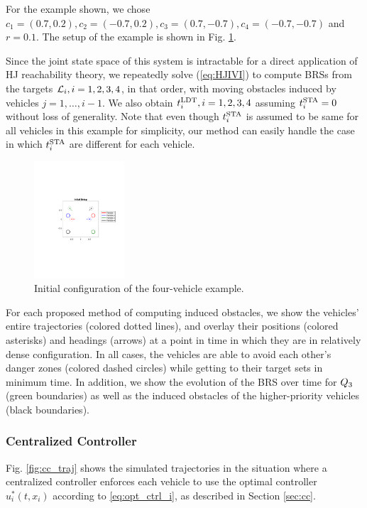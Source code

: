 \noindent For the example shown, we chose $c_1 = (0.7, 0.2), c_2 = (-0.7, 0.2), c_3 = (0.7, -0.7), c_4 = (-0.7, -0.7)$ and $r = 0.1$. The setup of the example is shown in Fig. \ref{fig:init_setup}.

Since the joint state space of this system is intractable for a direct application of HJ reachability theory, we repeatedly solve (\ref{eq:HJIVI}) to compute BRSs from the targets $\mathcal{L}_i, i =1,2,3,4$, in that order, with moving obstacles induced by vehicles $j=1,\ldots,i-1$. We also obtain $t^\text{LDT}_i, i=1,2,3,4$ assuming $t^\text{STA}_i=0$ without loss of generality. Note that even though $t^\text{STA}_i$ is assumed to be same for all vehicles in this example for simplicity, our method can easily handle the case in which $t^\text{STA}_i$ are different for each vehicle.

\begin{figure}
  \centering
  \includegraphics[width=0.30\textwidth]{"fig/init_setup"}
  \caption{Initial configuration of the four-vehicle example.}
  \label{fig:init_setup}
  \vspace{-1.5em}
\end{figure}

For each proposed method of computing induced obstacles, we show the vehicles' entire trajectories (colored dotted lines), and overlay their positions (colored asterisks) and headings (arrows) at a point in time in which they are in relatively dense configuration. In all cases, the vehicles are able to avoid each other's danger zones (colored dashed circles) while getting to their target sets in minimum time. In addition, we show the evolution of the BRS over time for $Q_{3}$ (green boundaries) as well as the induced obstacles of the higher-priority vehicles (black boundaries).

\subsubsection{Centralized Controller}
Fig. \ref{fig:cc_traj} shows the simulated trajectories in the situation where a centralized controller enforces each vehicle to use the optimal controller $u^*_i(t, x_i)$ according to \eqref{eq:opt_ctrl_i}, as described in Section \ref{sec:cc}.

